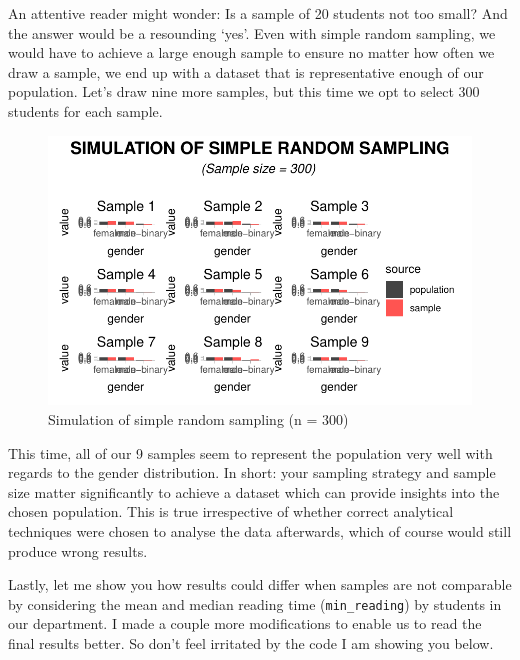 \documentclass[
  letterpaper,
  DIV=11,
  numbers=noendperiod]{scrreprt}
\begin{document}
An attentive reader might wonder: Is a sample of 20 students not too
small? And the answer would be a resounding `yes'. Even with simple
random sampling, we would have to achieve a large enough sample to
ensure no matter how often we draw a sample, we end up with a dataset
that is representative enough of our population. Let's draw nine more
samples, but this time we opt to select 300 students for each sample.

\begin{figure}[H]

{\centering \includegraphics{09_sources_of_bias_files/figure-latex/drawing-samples-of-300-1.pdf}

}

\caption{Simulation of simple random sampling (n = 300)}

\end{figure}%

This time, all of our 9 samples seem to represent the population very
well with regards to the gender distribution. In short: your sampling
strategy and sample size matter significantly to achieve a dataset which
can provide insights into the chosen population. This is true
irrespective of whether correct analytical techniques were chosen to
analyse the data afterwards, which of course would still produce wrong
results.

Lastly, let me show you how results could differ when samples are not
comparable by considering the mean and median reading time
(\texttt{min\_reading}) by students in our department. I made a couple
more modifications to enable us to read the final results better. So
don't feel irritated by the code I am showing you below.
\end{document}
